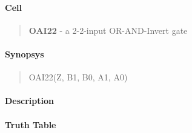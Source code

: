 \label{OAI22}
\paragraph{Cell}
\begin{quote}
    \textbf{OAI22} - a 2-2-input OR-AND-Invert gate
\end{quote}

\paragraph{Synopsys}
\begin{quote}
    OAI22(Z, B1, B0, A1, A0)
\end{quote}

\paragraph{Description}

%

\paragraph{Truth Table}


